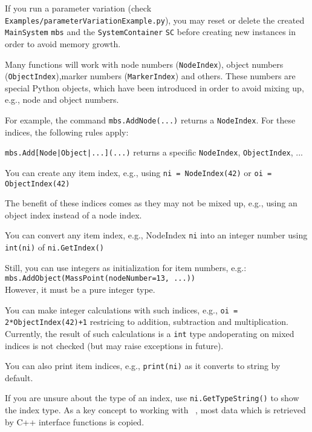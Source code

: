If you run a parameter variation (check \texttt{Examples/parameterVariationExample.py}), you may reset or delete the created \texttt{MainSystem} \texttt{mbs} and the \texttt{SystemContainer} \texttt{SC} before creating new instances in order to avoid memory growth.

\label{sec:itemIndex}
Many functions will work with node numbers (\texttt{NodeIndex}), object numbers (\texttt{ObjectIndex}),marker numbers (\texttt{MarkerIndex}) and others. These numbers are special Python objects, which have been introduced in order to avoid mixing up, e.g., node and object numbers. 

For example, the command \texttt{mbs.AddNode(...)} returns a \texttt{NodeIndex}. For these indices, the following rules apply:
\bi
  \item[] \texttt{mbs.Add[Node|Object|...](...)} returns a specific \texttt{NodeIndex}, \texttt{ObjectIndex}, ...
  \item[] You can create any item index, e.g., using \texttt{ni = NodeIndex(42)} or \texttt{oi = ObjectIndex(42)}
  \item[] The benefit of these indices comes as they may not be mixed up, e.g., using an object index instead of a node index.
  \item[] You can convert any item index, e.g., NodeIndex \texttt{ni} into an integer number using \texttt{int(ni)} of \texttt{ni.GetIndex()}
  \item[] Still, you can use integers as initialization for item numbers, e.g.:\\\texttt{mbs.AddObject(MassPoint(nodeNumber=13, ...))}\\However, it must be a pure integer type.
  \item[] You can make integer calculations with such indices, e.g., \texttt{oi = 2*ObjectIndex(42)+1} restricing to addition, subtraction and multiplication. Currently, the result of such calculations is a \texttt{int} type andoperating on mixed indices is not checked (but may raise exceptions in future).
  \item[] You can also print item indices, e.g., \texttt{print(ni)} as it converts to string by default.
  \item[] If you are unsure about the type of an index, use \texttt{ni.GetTypeString()} to show the index type.
\ei
{}
\label{sec:generalPythonInterface:copyref}
As a key concept to working with \codeName\ , most data which is retrieved by C++ interface functions is copied.
